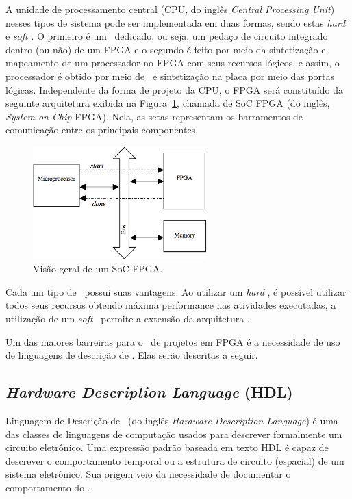    A unidade de processamento central (CPU, do inglês \textit{Central Processing Unit}) nesses tipos de sistema pode ser implementada em duas formas, sendo estas \textit{hard} e \textit{soft} \cores.
   O primeiro é um \core\ dedicado, ou seja, um pedaço de circuito integrado dentro (ou não) de um FPGA e o segundo é feito por meio da sintetização e mapeamento de um processador no FPGA com seus recursos lógicos, e assim, o processador é obtido por meio de \design\ e sintetização na placa por meio das portas lógicas.
   Independente da forma de projeto da CPU, o FPGA será constituído da seguinte arquitetura exibida na Figura~\ref{fig:rb-soc}, chamada de SoC FPGA (do inglês, \textit{System-on-Chip} FPGA).
   Nela, as setas representam os barramentos de comunicação entre os principais componentes.

   \begin{figure}[h] \centering
      \includegraphics[width=0.6\textwidth]{img/into-soc.png}
      \caption{Visão geral de um SoC FPGA.}
      \label{fig:rb-soc}
   \end{figure}

   Cada um tipo de \core\ possui suas vantagens.
   Ao utilizar um \textit{hard} \core, é possível utilizar todos seus recursos obtendo máxima performance nas atividades executadas, a utilização de um \textit{soft} \core\ permite a extensão da arquitetura \citep{Plessl2003}.

   Um das maiores barreiras para o \design\ de projetos em FPGA é a necessidade de uso de linguagens de descrição de \hardware.
   Elas serão descritas a seguir.


	\subsection{\textit{Hardware Description Language} (HDL)}
		Linguagem de Descrição de \Hardware\ (do inglês \textit{Hardware Description Language}) é uma das classes de linguagens de computação usados para descrever formalmente um circuito eletrônico.
      Uma expressão padrão baseada em texto HDL é capaz de descrever o comportamento temporal ou a estrutura de circuito (espacial) de um sistema eletrônico.
      Sua origem veio da necessidade de documentar o comportamento do \hardware \citep{Sass2010}.

